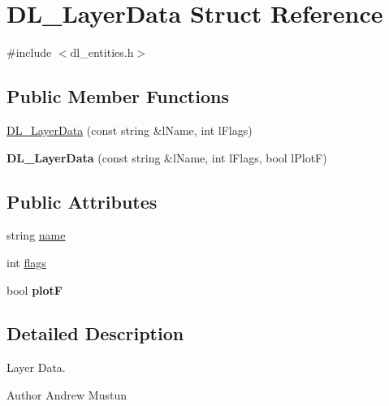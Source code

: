 \hypertarget{structDL__LayerData}{\section{D\-L\-\_\-\-Layer\-Data Struct Reference}
\label{structDL__LayerData}
}


{\ttfamily \#include $<$dl\-\_\-entities.\-h$>$}

\subsection*{Public Member Functions}
\begin{DoxyCompactItemize}
\item 
\hyperlink{structDL__LayerData_a998a2f877f865908e9ffb420dc846c93}{D\-L\-\_\-\-Layer\-Data} (const string \&l\-Name, int l\-Flags)
\item 
\hypertarget{structDL__LayerData_aa0df73be87c65a2de0d87433f87efbc2}{{\bfseries D\-L\-\_\-\-Layer\-Data} (const string \&l\-Name, int l\-Flags, bool l\-Plot\-F)}\label{structDL__LayerData_aa0df73be87c65a2de0d87433f87efbc2}

\end{DoxyCompactItemize}
\subsection*{Public Attributes}
\begin{DoxyCompactItemize}
\item 
string \hyperlink{structDL__LayerData_a63b33a515d1ad100d8a806f3cdb579a3}{name}
\item 
int \hyperlink{structDL__LayerData_a2c8ca9ae555472bdacb4790ae1331c74}{flags}
\item 
\hypertarget{structDL__LayerData_a12e6a7a6709bc8de3a1c792da526e0fa}{bool {\bfseries plot\-F}}\label{structDL__LayerData_a12e6a7a6709bc8de3a1c792da526e0fa}

\end{DoxyCompactItemize}


\subsection{Detailed Description}
Layer Data.

\begin{DoxyAuthor}{Author}
Andrew Mustun 
\end{DoxyAuthor}


